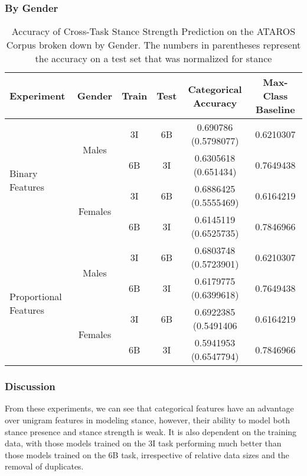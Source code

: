 \newpage
\subsubsection*{By Gender} 

\begin{table}[h]
\centering
\begin{tabular}{l c c c c c}
	\textbf{Experiment} & \textbf{Gender} & \textbf{Train} & \textbf{Test} & \textbf{Categorical Accuracy} & \textbf{Max-Class Baseline} \\
	\hline
	\multirow{4}{*}{Binary Features} & 
	\multirow{2}{*}{Males} & 
		3I & 6B  & \num{0.690786} (\num{0.5798077}) & \num{0.6210307} \\ 
		&&6B&3I  & \num{0.6305618} (\num{0.651434})  & \num{0.7649438} \\ 
	& \multirow{2}{*}{Females} & 
		3I & 6B  & \num{0.6886425} (\num{0.5555469}) & \num{0.6164219} \\ 
		&&6B&3I  & \num{0.6145119} (\num{0.6525735}) & \num{0.7846966} \\ 
	\hline
	\multirow{4}{*}{Proportional Features} & 
	\multirow{2}{*}{Males} & 
	   3I  & 6B  & \num{0.6803748} (\num{0.5723901})  & \num{0.6210307} \\ 
	   &&6B&3I   & \num{0.6179775} (\num{0.6399618})  & \num{0.7649438} \\ 
	& \multirow{2}{*}{Females} & 
	   3I  & 6B  & \num{0.6922385} (\num{0.5491406}  & \num{0.6164219} \\ 
	   &&6B&3I   & \num{0.5941953} (\num{0.6547794}) & \num{0.7846966} \\ 
\end{tabular}
\caption{Accuracy of Cross-Task Stance Strength Prediction on the ATAROS Corpus broken down by Gender.  The numbers in parentheses represent the accuracy on a test set that was normalized for stance}
\label{tab:cat_feats_WVS_by_gender}
\end{table}

\subsubsection{Discussion}

From these experiments, we can see that categorical features have an advantage over unigram features in modeling stance, however, their ability to model both stance presence and stance strength is weak.  It is also dependent on the training data, with those models trained on the 3I task performing much better than those models trained on the 6B task, irrespective of relative data sizes and the removal of duplicates.  

